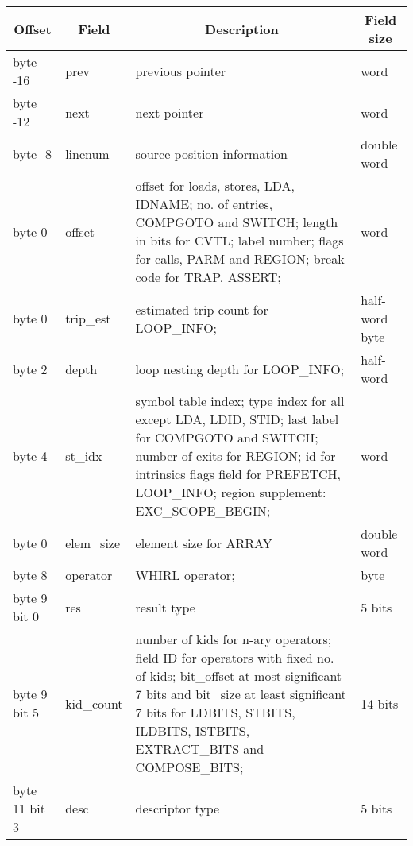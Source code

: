 \documentclass{article}
\begin{document}
\begin{table}[h]
\begin{center}
\begin{tabular}{|l|l|p{3in}|l|}\hline
\multicolumn{1}{|c|}{Offset} &
\multicolumn{1}{|c|}{Field} &
\multicolumn{1}{|c|}{Description} &
\multicolumn{1}{|c|}{Field size} \\\hline\hline
byte -16  & prev & previous pointer & word \\\hline
byte -12 & next & next pointer & word \\\hline
byte -8 & linenum & source position information & double word \\\hline
byte 0  & offset & 
offset for loads, stores,
\index{LDA}%
LDA,
\index{IDNAME}%
IDNAME;
no. of entries,
\index{COMPGOTO}%
COMPGOTO and
\index{SWITCH}%
SWITCH;
length in bits for
\index{CVTL}%
CVTL;
label number;
flags for calls,
\index{PARM}%
PARM and
\index{REGION}%
REGION;
break code for
\index{TRAP}%
TRAP,
\index{ASSERT}%
ASSERT; & word\\\hline
%
byte 0 & trip\_est & estimated trip count for 
\index{LOOP\_INFO}%
LOOP\_INFO; & half-word byte\\\hline
%
byte 2  & depth & loop nesting depth for LOOP\_INFO; & half-word \\\hline
byte 4 & st\_idx & symbol table index; 
type index for all except
\index{LDA}%
LDA,
\index{LDID}%
LDID,
\index{STID}%
STID;
last label for
\index{COMPGOTO}%
COMPGOTO and
\index{SWITCH}%
SWITCH;
number of exits for
\index{REGION}%
REGION;
id for intrinsics
flags field for
\index{PREFETCH}%
PREFETCH, 
\index{LOOP\_INFO}%
LOOP\_INFO;
region supplement: EXC\_SCOPE\_BEGIN;
& word \\\hline
%
byte 0 & elem\_size & element size for
\index{ARRAY}%
ARRAY & double word \\\hline\hline
%
byte 8 & operator & WHIRL operator;  & byte \\\hline 
%
byte 9 bit 0 & res & result type& 5 bits\\\hline 
%
byte 9 bit 5  & kid\_count  & number of kids for n-ary operators; field ID for
operators with fixed no. of kids;
bit\_offset at most significant 7 bits and bit\_size at least significant
7 bits for
\index{LDBITS}%
LDBITS,
\index{STBITS}%
STBITS,
\index{ILDBITS}%
ILDBITS,
\index{ISTBITS}%
ISTBITS, 
\index{EXTRACT\_BITS}%
EXTRACT\_BITS and
\index{COMPOSE\_BITS}%
COMPOSE\_BITS; & 14 bits\\\hline
%
byte 11 bit 3 & desc  & descriptor type & 5 bits \\\hline

\end{tabular}
\end{center}
\end{table}
\end{document}
